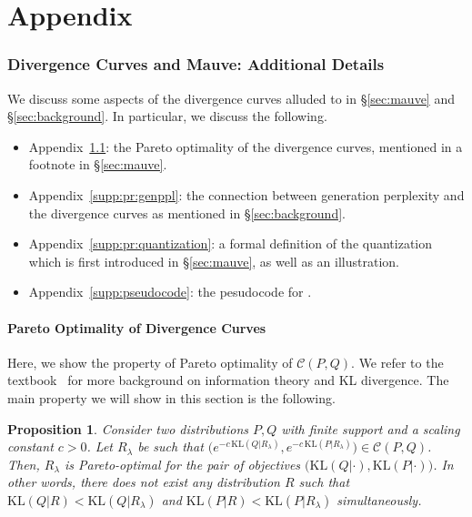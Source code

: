 \documentclass{article}
\newcommand \Ccal {\mathcal C}
\newcommand \e {e}
\newtheorem{proposition}[theorem]{Proposition}
\theoremstyle{definition}
\newcommand{\kl}{{\mathrm{KL}}}
\newcommand{\name}{{\fontfamily{bch}\selectfont{\textsc{Mauve}}}\xspace}
\begin{document}



%

\clearpage
\appendix

\part{Appendix} %
\parttoc %
\clearpage

%
%
\section{Divergence Curves and Mauve: Additional Details}
\label{supp:pr}

We discuss some aspects of the divergence curves alluded to in \S\ref{sec:mauve} and \S\ref{sec:background}. 
In particular, we discuss the following.
\begin{itemize}
    \item Appendix~\ref{supp:pr:pareto}: the Pareto optimality of the divergence curves, mentioned in a footnote in \S\ref{sec:mauve}.
    \item Appendix~\ref{supp:pr:genppl}: the connection between generation perplexity and the divergence curves as mentioned in \S\ref{sec:background}.
    \item Appendix~\ref{supp:pr:quantization}: a formal definition of the quantization which is first introduced in \S\ref{sec:mauve}, as well as an illustration.
    \item Appendix~\ref{supp:pseudocode}: the pesudocode for \name.
\end{itemize}


\subsection{Pareto Optimality of Divergence Curves} \label{supp:pr:pareto}
Here, we show the property of Pareto optimality of $\Ccal(P, Q)$.
We refer to the textbook~\cite{kobayashi2007mathematics} for more background on information theory and KL divergence.
%
%
%
%
The main property we will show in this section is the following. 
%

\begin{proposition} \label{prop:div-pareto-opt}
    Consider two distributions $P, Q$
    with finite support and a scaling
    constant $c > 0$. 
    Let $R_\lambda$ be such that 
    $\big(\e^{-c\, \kl(Q|R_\lambda)}, 
    \e^{-c\, \kl(P|R_\lambda)}\big) \in \Ccal(P, Q)$.
    Then, $R_\lambda$ is Pareto-optimal for 
    the pair of objectives
    $\big(\kl(Q|\cdot), \kl(P | \cdot)\big)$.
    In other words, there does {\em not} exist any distribution $R$ such that 
    $\kl(Q|R) < \kl(Q|R_\lambda)$
    and 
    $\kl(P|R) < \kl(P|R_\lambda)$ simultaneously.
\end{proposition}
\end{document}
